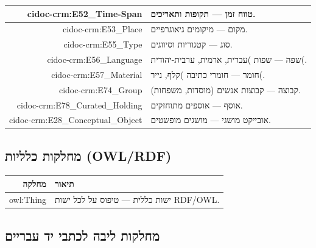 \begin{longtable}{|r|p{10cm}|}
cidoc-crm:E52\_Time-Span & 
טווח זמן — תקופות ותאריכים.\\
\hline

cidoc-crm:E53\_Place & 
מקום — מיקומים גיאוגרפיים.\\
\hline

cidoc-crm:E55\_Type & 
סוג — קטגוריות וסיווגים.\\
\hline

cidoc-crm:E56\_Language & 
שפה — שפות )עברית, ארמית, ערבית-יהודית(.\\
\hline

cidoc-crm:E57\_Material & 
חומר — חומרי כתיבה )קלף, נייר(.\\
\hline

cidoc-crm:E74\_Group & 
קבוצה — קבוצות אנשים (מוסדות, משפחות).\\
\hline

cidoc-crm:E78\_Curated\_Holding & 
אוסף — אוספים מתוחזקים.\\
\hline

cidoc-crm:E28\_Conceptual\_Object & 
אובייקט מושגי — מושגים מופשטים.\\
\hline
\end{longtable}

\subsection{מחלקות כלליות (OWL/RDF)}

\begin{longtable}{|r|p{10cm}|}
\hline
\textbf{מחלקה} & \textbf{תיאור} \\
\hline
\endhead

owl:Thing & ישות כללית — טיפוס על לכל ישות RDF/OWL.\\
\hline
\end{longtable}

\subsection{מחלקות ליבה לכתבי יד עבריים}


